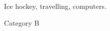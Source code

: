 



\begin{cvhonors}

  \cvhonor
    {Ice hockey, travelling, computers.} %

\end{cvhonors}
\vspace{5pt}



\begin{cvhonors}

  \cvhonor
    {Category B} %



\end{cvhonors}
\vspace{5pt}

